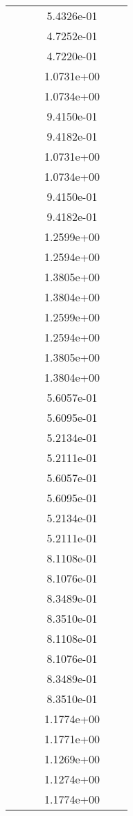 \begin{xltabular}{\textwidth}{r|rS[table-format=1.3e+2]S[table-format=1.4e+2]S[table-format=1.4e+2]S[table-format=-1.5]}
&  &  & 5.4326e-01 & & \\
&  &  & 4.7252e-01 & & \\
&  &  & 4.7220e-01 & & \\
&  &  & 1.0731e+00 & & \\
&  &  & 1.0734e+00 & & \\
&  &  & 9.4150e-01 & & \\
&  &  & 9.4182e-01 & & \\
&  &  & 1.0731e+00 & & \\
&  &  & 1.0734e+00 & & \\
&  &  & 9.4150e-01 & & \\
&  &  & 9.4182e-01 & & \\
&  &  & 1.2599e+00 & & \\
&  &  & 1.2594e+00 & & \\
&  &  & 1.3805e+00 & & \\
&  &  & 1.3804e+00 & & \\
&  &  & 1.2599e+00 & & \\
&  &  & 1.2594e+00 & & \\
&  &  & 1.3805e+00 & & \\
&  &  & 1.3804e+00 & & \\
&  &  & 5.6057e-01 & & \\
&  &  & 5.6095e-01 & & \\
&  &  & 5.2134e-01 & & \\
&  &  & 5.2111e-01 & & \\
&  &  & 5.6057e-01 & & \\
&  &  & 5.6095e-01 & & \\
&  &  & 5.2134e-01 & & \\
&  &  & 5.2111e-01 & & \\
&  &  & 8.1108e-01 & & \\
&  &  & 8.1076e-01 & & \\
&  &  & 8.3489e-01 & & \\
&  &  & 8.3510e-01 & & \\
&  &  & 8.1108e-01 & & \\
&  &  & 8.1076e-01 & & \\
&  &  & 8.3489e-01 & & \\
&  &  & 8.3510e-01 & & \\
&  &  & 1.1774e+00 & & \\
&  &  & 1.1771e+00 & & \\
&  &  & 1.1269e+00 & & \\
&  &  & 1.1274e+00 & & \\
&  &  & 1.1774e+00 & & \\

\end{xltabular}

